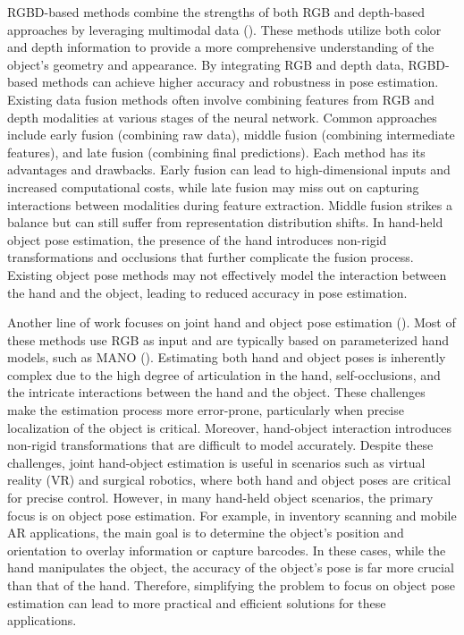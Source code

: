 RGBD-based methods combine the strengths of both RGB and depth-based approaches by leveraging multimodal data (\cite{wang2019densefusion, he2020pvn3d, hong2024rdpn6d}). These methods utilize both color and depth information to provide a more comprehensive understanding of the object's geometry and appearance. By integrating RGB and depth data, RGBD-based methods can achieve higher accuracy and robustness in pose estimation. Existing data fusion methods often involve combining features from RGB and depth modalities at various stages of the neural network. Common approaches include early fusion (combining raw data), middle fusion (combining intermediate features), and late fusion (combining final predictions). Each method has its advantages and drawbacks. Early fusion can lead to high-dimensional inputs and increased computational costs, while late fusion may miss out on capturing interactions between modalities during feature extraction. Middle fusion strikes a balance but can still suffer from representation distribution shifts. In hand-held object pose estimation, the presence of the hand introduces non-rigid transformations and occlusions that further complicate the fusion process. Existing object pose methods may not effectively model the interaction between the hand and the object, leading to reduced accuracy in pose estimation. 

Another line of work focuses on joint hand and object pose estimation (\cite{doosti2020hope, lin2023harmonious, wang2023interacting, woo2023survey}). Most of these methods use RGB as input and are typically based on parameterized hand models, such as MANO (\cite{romero2022embodied}). Estimating both hand and object poses is inherently complex due to the high degree of articulation in the hand, self-occlusions, and the intricate interactions between the hand and the object. These challenges make the estimation process more error-prone, particularly when precise localization of the object is critical. Moreover, hand-object interaction introduces non-rigid transformations that are difficult to model accurately. Despite these challenges, joint hand-object estimation is useful in scenarios such as virtual reality (VR) and surgical robotics, where both hand and object poses are critical for precise control. However, in many hand-held object scenarios, the primary focus is on object pose estimation. For example, in inventory scanning and mobile AR applications, the main goal is to determine the object's position and orientation to overlay information or capture barcodes. In these cases, while the hand manipulates the object, the accuracy of the object's pose is far more crucial than that of the hand. Therefore, simplifying the problem to focus on object pose estimation can lead to more practical and efficient solutions for these applications.

